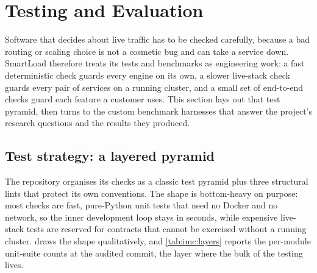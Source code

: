 \section{Testing and Evaluation}\label{ch:impl_testing}

Software that decides about live traffic has to be checked carefully, because a bad
routing or scaling choice is not a cosmetic bug and can take a service down. SmartLoad
therefore treats its tests and benchmarks as engineering work: a fast deterministic
check guards every engine on its own, a slower live-stack check guards every pair of
services on a running cluster, and a small set of end-to-end checks guard each feature
a customer uses. This section lays out that test pyramid, then turns to the custom
benchmark harnesses that answer the project's research questions and the results they
produced.

\subsection{Test strategy: a layered pyramid}\label{imc:pyramid}

The repository organises its checks as a classic test pyramid plus three structural
lints that protect its own conventions. The shape is bottom-heavy on purpose: most
checks are fast, pure-Python unit tests that need no Docker and no network, so the
inner development loop stays in seconds, while expensive live-stack tests are reserved
for contracts that cannot be exercised without a running cluster. 
draws the shape qualitatively, and \cref{tab:imc:layers} reports the per-module
unit-suite counts at the audited commit, the layer where the bulk of the testing
lives.

